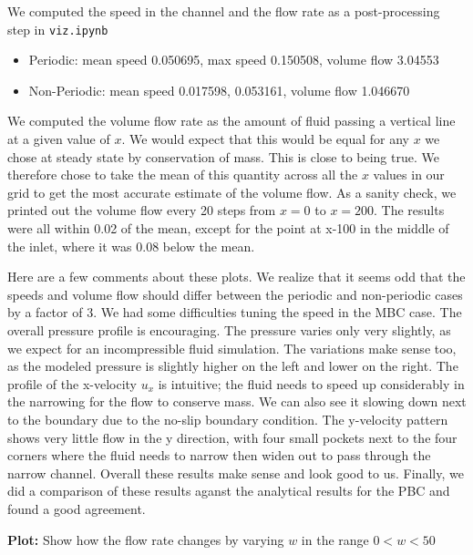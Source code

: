 \documentclass[11pt]{article}
\newcommand{\tty}[1]{\texttt{#1}}
\begin{document}
We computed the speed in the channel and the flow rate as a post-processing step in \tty{viz.ipynb}
\begin{itemize}
\item Periodic: mean speed 0.050695, max speed 0.150508, volume flow 3.04553
\item Non-Periodic: mean speed 0.017598, 0.053161, volume flow 1.046670
\end{itemize}

We computed the volume flow rate as the amount of fluid passing a vertical line
at a given value of $x$.  We would expect that this would be equal for any $x$ 
we chose at steady state by conservation of mass.  This is close to being true.
We therefore chose to take the mean of this quantity across all the $x$ values
in our grid to get the most accurate estimate of the volume flow.
As a sanity check, we printed out the volume flow every 20 steps from $x=0$ to 
$x=200$.  The results were all within 0.02 of the mean, except for the point
at x-100 in the middle of the inlet, where it was 0.08 below the mean.

Here are a few comments about these plots.
We realize that it seems odd that the speeds and volume flow should differ between
the periodic and non-periodic cases by a factor of 3.  
We had some difficulties tuning the speed in the MBC case.
The overall pressure profile is encouraging.  
The pressure varies only very slightly, as we expect for an incompressible fluid simulation.
The variations make sense too, as the modeled pressure is slightly higher on
the left and lower on the right.
The profile of the x-velocity $u_x$ is intuitive; the fluid needs to speed up
considerably in the narrowing for the flow to conserve mass.
We can also see it slowing down next to the boundary due to the 
no-slip boundary condition.
The y-velocity pattern shows very little flow in the y direction,
with four small pockets next to the four corners where the fluid
needs to narrow then widen out to pass through the narrow channel.
Overall these results make sense and look good to us.
Finally, we did a comparison of these results aganst the analytical
results for the PBC and found a good agreement.

    \textbf{Plot:}
    Show how the flow rate changes by varying $w$ in the range $0<w<50$
\end{document}
